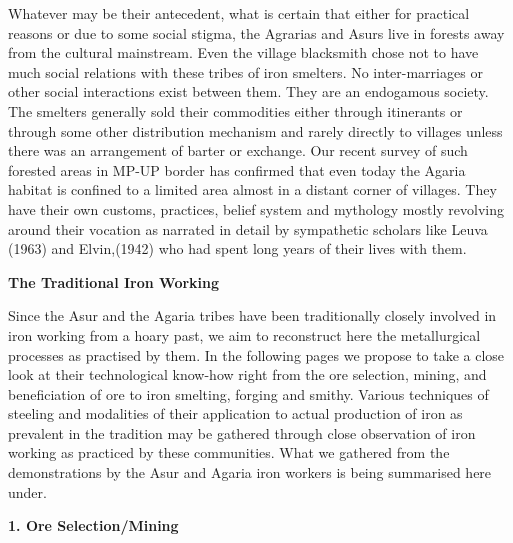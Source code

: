 Whatever may be their antecedent, what is certain that either for practical reasons or due to some social stigma, the Agrarias and Asurs live in forests away from the cultural mainstream. Even the village blacksmith chose not to have much social relations with these tribes of iron smelters. No inter-marriages or other social interactions exist between them. They are an endogamous society. The smelters generally sold their commodities either through itinerants or through some other distribution mechanism and rarely directly to villages unless there was an arrangement of barter or exchange. Our recent survey of such forested areas in MP-UP border has confirmed that even today the Agaria habitat is confined to a limited area almost in a distant corner of villages. They have their own customs, practices, belief system and mythology mostly revolving around their vocation as narrated in detail by sympathetic scholars like Leuva (1963) and Elvin,(1942) who had spent long years of their lives with them. 

\noindent \textbf{\large The Traditional Iron Working}

Since the Asur and the Agaria tribes have been traditionally closely involved in iron working from a hoary past, we aim to reconstruct here the metallurgical processes as practised by them. In the following pages we propose to take a close look at their technological know-how right from the ore selection, mining, and beneficiation of ore to iron smelting, forging and smithy. Various techniques of steeling and modalities of their application to actual production of iron as prevalent in the tradition may be gathered through close observation of iron working as practiced by these communities. What we gathered from the demonstrations by the Asur and Agaria iron workers is being summarised here under.

\noindent \textbf{\large 1. Ore Selection/Mining}

